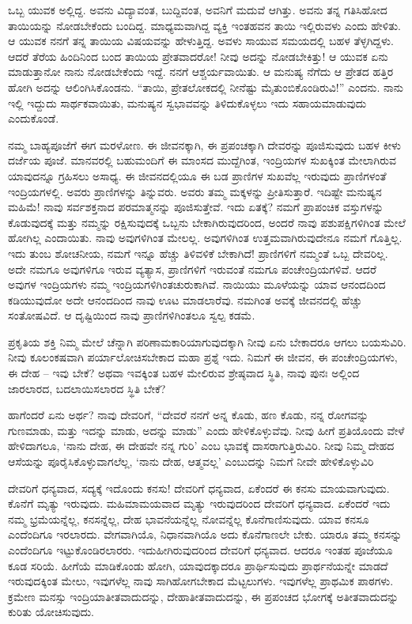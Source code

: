 ಒಬ್ಬ ಯುವಕ ಅಲ್ಲಿದ್ದ. ಅವನು ವಿದ್ಯಾವಂತ, ಬುದ್ದಿವಂತ, ಅವನಿಗೆ ಮದುವೆ ಆಗಿತ್ತು. ಅವನು ತನ್ನ ಗತಿಸಿಹೋದ ತಾಯಿಯನ್ನು ನೋಡಬೇಕೆಂದು ಬಂದಿದ್ದ. ಮಾಧ್ಯಮವಾಗಿದ್ದ ವ್ಯಕ್ತಿ ಇಂತಹವನ ತಾಯಿ ಇಲ್ಲಿರುವಳು ಎಂದು ಹೇಳಿತು. ಆ ಯುವಕ ನನಗೆ ತನ್ನ ತಾಯಿಯ ವಿಷಯವನ್ನು ಹೇಳುತ್ತಿದ್ದ. ಅವಳು ಸಾಯುವ ಸಮಯದಲ್ಲಿ ಬಹಳ ತೆಳ್ಳಗಿದ್ದಳು. ಆದರೆ ತೆರೆಯ ಹಿಂದಿನಿಂದ ಬಂದ ತಾಯಿಯ ಪ್ರೇತವಾದರೋ! ನೀವು ಅದನ್ನು ನೋಡಬೇಕಿತ್ತು! ಆ ಯುವಕ ಏನು ಮಾಡುತ್ತಾನೋ ನಾನು ನೋಡಬೇಕೆಂದು ಇದ್ದೆ. ನನಗೆ ಆಶ್ಚರ್ಯವಾಯಿತು. ಆ ಮನುಷ್ಯ ನೆಗೆದು ಆ ಪ್ರೇತದ ಹತ್ತಿರ ಹೋಗಿ ಅದನ್ನು ಆಲಿಂಗಿಸಿಕೊಂಡನು. “ತಾಯಿ, ಪ್ರೇತಲೋಕದಲ್ಲಿ ನೀನೆಷ್ಟು ಮೈತುಂಬಿಕೊಂಡಿರುವಿ!” ಎಂದನು. ನಾನು ಇಲ್ಲಿ ಇದ್ದುದು ಸಾರ್ಥಕವಾಯಿತು, ಮನುಷ್ಯನ ಸ್ವಭಾವವನ್ನು ತಿಳಿದುಕೊಳ್ಳಲು ಇದು ಸಹಾಯಮಾಡುವುದು ಎಂದುಕೊಂಡೆ.

ನಮ್ಮ ಬಾಹ್ಯಪೂಜೆಗೆ ಈಗ ಮರಳೋಣ. ಈ ಜೀವನಕ್ಕಾಗಿ, ಈ ಪ್ರಪಂಚಕ್ಕಾಗಿ ದೇವರನ್ನು ಪೂಜಿಸುವುದು ಬಹಳ ಕೀಳು ದರ್ಜೆಯ ಪೂಜೆ. ಮಾನವರಲ್ಲಿ ಬಹುಮಂದಿಗೆ ಈ ಮಾಂಸದ ಮುದ್ದೆಗಿಂತ, ಇಂದ್ರಿಯಗಳ ಸುಖಕ್ಕಿಂತ ಮೇಲಾಗಿರುವ ಯಾವುದನ್ನೂ ಗ್ರಹಿಸಲು ಅಸಾಧ್ಯ. ಈ ಜೀವನದಲ್ಲಿಯೂ ಈ ಬಡ ಪ್ರಾಣಿಗಳ ಸುಖವೆಲ್ಲ ಇರುವುದು ಪ್ರಾಣಿಗಳಂತೆ ಇಂದ್ರಿಯಗಳಲ್ಲಿ. ಅವರು ಪ್ರಾಣಿಗಳನ್ನು ತಿನ್ನುವರು. ಅವರು ತಮ್ಮ ಮಕ್ಕಳನ್ನು ಪ್ರೀತಿಸುತ್ತಾರೆ. ಇದಿಷ್ಟೇ ಮನುಷ್ಯನ ಮಹಿಮೆ! ನಾವು ಸರ್ವಶಕ್ತನಾದ ಪರಮಾತ್ಮನನ್ನು ಪೂಜಿಸುತ್ತೇವೆ. ಇದು ಏತಕ್ಕೆ? ನಮಗೆ ಪ್ರಾಪಂಚಿಕ ವಸ್ತುಗಳನ್ನು ಕೊಡುವುದಕ್ಕೆ ಮತ್ತು ನಮ್ಮನ್ನು ರಕ್ಷಿಸುವುದಕ್ಕೆ ಒಬ್ಬನು ಬೇಕಾಗಿರುವುದರಿಂದ, ಅಂದರೆ ನಾವು ಪಶುಪಕ್ಷಿಗಳಿಗಿಂತ ಮೇಲೆ ಹೋಗಿಲ್ಲ ಎಂದಾಯಿತು. ನಾವು ಅವುಗಳಿಗಿಂತ ಮೇಲಲ್ಲ. ಅವುಗಳಿಗಿಂತ ಉತ್ತಮವಾಗಿರುವುದೇನೂ ನಮಗೆ ಗೊತ್ತಿಲ್ಲ. ಇದು ತುಂಬ ಶೋಚನೀಯ, ನಮಗೆ ಇನ್ನೂ ಹೆಚ್ಚು ತಿಳಿವಳಿಕೆ ಬೇಕಾಗಿದೆ! ಪ್ರಾಣಿಗಳಿಗೆ ನಮ್ಮಂತೆ ಒಬ್ಬ ದೇವರಿಲ್ಲ. ಅದೇ ನಮಗೂ ಅವುಗಳಿಗೂ ಇರುವ ವ್ಯತ್ಯಾಸ, ಪ್ರಾಣಿಗಳಿಗೆ ಇರುವಂತೆ ನಮಗೂ ಪಂಚೇಂದ್ರಿಯಗಳಿವೆ. ಆದರೆ ಅವುಗಳ ಇಂದ್ರಿಯಗಳು ನಮ್ಮ ಇಂದ್ರಿಯಗಳಿಗಿಂತ\break ಚುರುಕಾಗಿವೆ. ನಾಯಿಯು ಮೂಳೆಯನ್ನು ಯಾವ ಆನಂದದಿಂದ ಕಡಿಯುವುದೋ ಅದೇ ಆನಂದದಿಂದ ನಾವು ಊಟ ಮಾಡಲಾರೆವು. ನಮಗಿಂತ ಅವಕ್ಕೆ ಜೀವನದಲ್ಲಿ ಹೆಚ್ಚು ಸಂತೋಷವಿದೆ. ಆ ದೃಷ್ಟಿಯಿಂದ ನಾವು ಪ್ರಾಣಿಗಳಿಗಿಂತಲೂ ಸ್ವಲ್ಪ ಕಡಮೆ.

ಪ್ರಕೃತಿಯ ಶಕ್ತಿ ನಿಮ್ಮ ಮೇಲೆ ಚೆನ್ನಾಗಿ ಪರಿಣಾಮಕಾರಿಯಾಗುವುದಕ್ಕಾಗಿ ನೀವು ಏನು ಬೇಕಾದರೂ ಆಗಲು ಬಯಸುವಿರಿ. ನೀವು ಕೂಲಂಕಷವಾಗಿ ಪರ್ಯಾಲೋಚಿಸಬೇಕಾದ ಮಹಾ ಪ್ರಶ್ನೆ ಇದು. ನಿಮಗೆ ಈ ಜೀವನ, ಈ ಪಂಚೇಂದ್ರಿಯಗಳು, ಈ ದೇಹ – ಇವು ಬೇಕೆ? ಅಥವಾ ಇವಕ್ಕಿಂತ ಬಹಳ ಮೇಲಿರುವ ಶ್ರೇಷ್ಠವಾದ ಸ್ಥಿತಿ, ನಾವು ಪುನಃ ಅಲ್ಲಿಂದ ಜಾರಲಾರದ, ಬದಲಾಯಿಸಲಾರದ ಸ್ಥಿತಿ ಬೇಕೆ?

ಹಾಗೆಂದರೆ ಏನು ಅರ್ಥ? ನಾವು ದೇವರಿಗೆ, “ದೇವರೆ ನನಗೆ ಅನ್ನ ಕೊಡು, ಹಣ ಕೊಡು, ನನ್ನ ರೋಗವನ್ನು ಗುಣಮಾಡು, ಮತ್ತು ಇದನ್ನು ಮಾಡು, ಅದನ್ನು ಮಾಡು” ಎಂದು ಹೇಳಿಕೊಳ್ಳುವೆವು. ನೀವು ಹೀಗೆ ಪ್ರತಿಯೊಂದು ವೇಳೆ ಹೇಳಿದಾಗಲೂ, `ನಾನು ದೇಹ, ಈ ದೇಹವೇ ನನ್ನ ಗುರಿ' ಎಂಬ ಭಾವಕ್ಕೆ ದಾಸರಾಗುತ್ತಿರುವಿರಿ. ನೀವು ನಿಮ್ಮ ದೇಹದ ಆಸೆಯನ್ನು ಪೂರೈಸಿಕೊಳ್ಳುವಾಗಲೆಲ್ಲ, `ನಾನು ದೇಹ, ಆತ್ಮವಲ್ಲ' ಎಂಬುದನ್ನು ನಿಮಗೆ ನೀವೇ ಹೇಳಿಕೊಳ್ಳುವಿರಿ

ದೇವರಿಗೆ ಧನ್ಯವಾದ, ಸದ್ಯಕ್ಕೆ ಇದೊಂದು ಕನಸು! ದೇವರಿಗೆ ಧನ್ಯವಾದ, ಏಕೆಂದರೆ ಈ ಕನಸು ಮಾಯವಾಗುವುದು. ಕೊನೆಗೆ ಮೃತ್ಯು ಇರುವುದು. ಮಹಿಮಾಮಯವಾದ ಮೃತ್ಯು ಇರುವುದರಿಂದ ದೇವರಿಗೆ ಧನ್ಯವಾದ. ಏಕೆಂದರೆ ಇದು ನಮ್ಮ ಭ್ರಮೆಯನ್ನೆಲ್ಲ, ಕನಸನ್ನೆಲ್ಲ, ದೇಹ ಭಾವನೆಯನ್ನೆಲ್ಲ ನೋವನ್ನೆಲ್ಲ ಕೊನೆಗಾಣಿಸುವುದು. ಯಾವ ಕನಸೂ ಎಂದೆಂದಿಗೂ ಇರಲಾರದು. ವೇಗವಾಗಿಯೊ, ನಿಧಾನವಾಗಿಯೊ ಅದು ಕೊನೆಗಾಣಲೇ ಬೇಕು. ಯಾರೂ ತಮ್ಮ ಕನಸನ್ನು ಎಂದೆಂದಿಗೂ ಇಟ್ಟುಕೊಂಡಿರಲಾರರು. ಇದು\break ಹೀಗಿರುವುದರಿಂದ ದೇವರಿಗೆ ಧನ್ಯವಾದ. ಆದರೂ ಇಂತಹ ಪೂಜೆಯೂ ಕೂಡ ಸರಿಯೆ. ಹೀಗೆಯೆ ಮಾಡಿಕೊಂಡು ಹೋಗಿ, ಯಾವುದಕ್ಕಾದರೂ ಪ್ರಾರ್ಥಿಸುವುದು ಪ್ರಾರ್ಥನೆಯನ್ನೇ ಮಾಡದೆ ಇರುವುದಕ್ಕಿಂತ ಮೇಲು, ಇವುಗಳೆಲ್ಲ ನಾವು ಸಾಗಿಹೋಗಬೇಕಾದ ಮೆಟ್ಟಲುಗಳು. ಇವುಗಳೆಲ್ಲ ಪ್ರಾಥಮಿಕ ಪಾಠಗಳು. ಕ್ರಮೇಣ ಮನಸ್ಸು ಇಂದ್ರಿಯಾತೀತವಾದುದನ್ನು, ದೇಹಾತೀತವಾದುದನ್ನು, ಈ ಪ್ರಪಂಚದ ಭೋಗಕ್ಕೆ ಅತೀತವಾದುದನ್ನು ಕುರಿತು ಯೋಚಿಸುವುದು.

